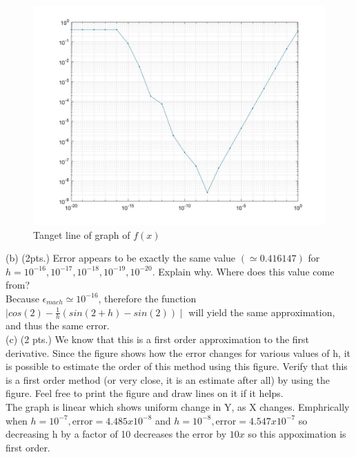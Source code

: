 \documentclass{article}
\begin{document}
\begin{figure}[H]
  \includegraphics[width=\linewidth]{docs/error_calc.jpg}
  \caption{Tanget line of graph of $f(x)$}
\end{figure}

\noindent
(b) (2pts.) Error appears to be exactly the same value $( \simeq 0.416147)$ for $h=10^{-16},10^{-17},10^{-18}, 10^{-19}, 10^{-20}$. Explain why. Where does this value come from? \\

\noindent
Because $ \epsilon_{mach} \simeq 10^{-16}$, therefore the function $ \mid cos(2) - \frac{1}{h}(sin(2+h) - sin(2)) \mid $ will yield the same approximation, and thus the same error.\\

\noindent
(c) (2 pts.) We know that this is a first order approximation to the first derivative. Since the figure shows how the error changes for various values of h, it is possible to estimate the order of this method using this figure. Verify that this is a first order method (or very close, it is an estimate after all) by using the figure. Feel free to print the figure and draw lines on it if it helps.\\

\noindent
The graph is linear which shows uniform change in Y, as X changes. Emphrically when $ h = 10^{-7}, \text{error} = 4.485 x 10^{-8}$ and $h = 10^{-8}, \text{error} = 4.547 x 10^{-7}$ so decreasing h by a factor of 10 decreases the error by $10x$ so this appoximation is first order.\\
\end{document}
